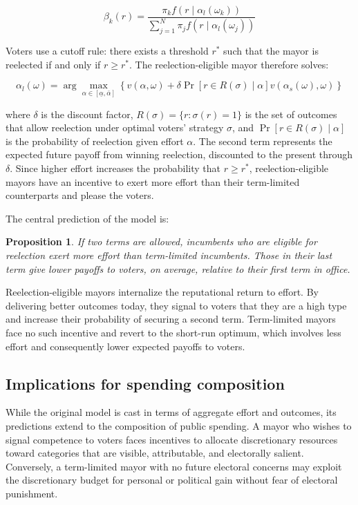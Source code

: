 \documentclass[12pt, a4paper]{article}
\newtheorem{proposition}{Proposition}
\begin{document}
\begin{equation}
    \beta_k(r) = \frac{\pi_k f(r \; | \; \alpha_l(\omega_k))}{\sum_{j=1}^{N} \pi_j f(r \; | \; \alpha_l(\omega_j))}
\end{equation}

Voters use a cutoff rule: there exists a threshold $r^*$ such that the mayor is reelected if and only if $r \geq r^*$. The reelection-eligible mayor therefore solves:

\begin{equation}
    \alpha_l(\omega) = \arg\max_{\alpha \in [\underline{\alpha}, \bar{\alpha}]} \left\{ v(\alpha, \omega) + \delta \Pr\left[r \in R(\sigma) \mid \alpha\right] v(\alpha_s(\omega), \omega) \right\}
\end{equation}

where $\delta$ is the discount factor, $R(\sigma) = \{r : \sigma(r) = 1\}$ is the set of outcomes that allow reelection under optimal voters' strategy $\sigma$, and $\Pr[r \in R(\sigma) \mid \alpha]$ is the probability of reelection given effort $\alpha$. The second term represents the expected future payoff from winning reelection, discounted to the present through $\delta$. Since higher effort increases the probability that $r \geq r^*$, reelection-eligible mayors have an incentive to exert more effort than their term-limited counterparts and please the voters.

The central prediction of the model is:

\begin{proposition}
If two terms are allowed, incumbents who are eligible for reelection exert more effort than term-limited incumbents. Those in their last term give lower payoffs to voters, on average, relative to their first term in office.
\end{proposition}

Reelection-eligible mayors internalize the reputational return to effort. By delivering better outcomes today, they signal to voters that they are a high type and increase their probability of securing a second term. Term-limited mayors face no such incentive and revert to the short-run optimum, which involves less effort and consequently lower expected payoffs to voters.

\subsection*{Implications for spending composition}

While the original model is cast in terms of aggregate effort and outcomes, its predictions extend to the composition of public spending. A mayor who wishes to signal competence to voters faces incentives to allocate discretionary resources toward categories that are visible, attributable, and electorally salient. Conversely, a term-limited mayor with no future electoral concerns may exploit the discretionary budget for personal or political gain without fear of electoral punishment.
\end{document}
